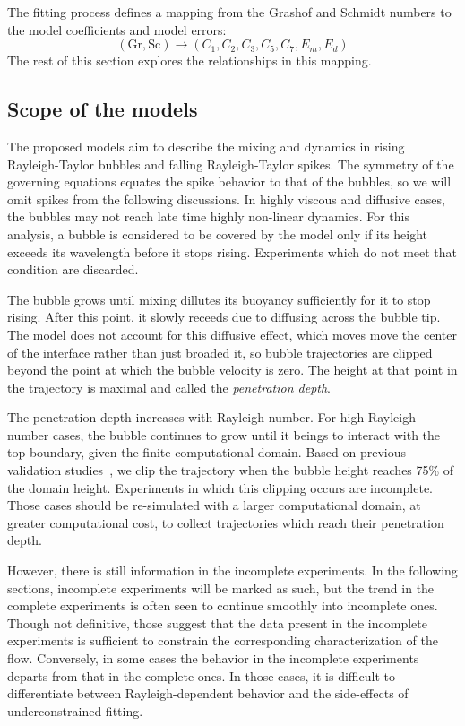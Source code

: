 The fitting process defines a mapping from the Grashof and Schmidt numbers to the model coefficients and model errors:
\begin{equation}
\left(\text{Gr}, \text{Sc}\right) \rightarrow \left(C_1, C_2, C_3, C_5, C_7, E_m, E_d\right) 
\end{equation}
The rest of this section explores the relationships in this mapping.

\subsection{Scope of the models}

The proposed models aim to describe the mixing and dynamics in rising Rayleigh-Taylor bubbles and falling Rayleigh-Taylor spikes.
The symmetry of the governing equations equates the spike behavior to that of the bubbles, so we will omit spikes from the following discussions.
In highly viscous and diffusive cases, the bubbles may not reach late time highly non-linear dynamics.
For this analysis, a bubble is considered to be covered by the model only if its height exceeds its wavelength before it stops rising.
Experiments which do not meet that condition are discarded.

The bubble grows until mixing dillutes its buoyancy sufficiently for it to stop rising.
After this point, it slowly receeds due to diffusing across the bubble tip.
The model does not account for this diffusive effect, which moves move the center of the interface rather than just broaded it, so bubble trajectories are clipped beyond the point at which the bubble velocity is zero.
The height at that point in the trajectory is maximal and called the \textit{penetration depth}.

The penetration depth increases with Rayleigh number.
For high Rayleigh number cases, the bubble continues to grow until it beings to interact with the top boundary, given the finite computational domain.
Based on previous validation studies~\cite{Hutchinson2016}, we clip the trajectory when the bubble height reaches 75\% of the domain height.
Experiments in which this clipping occurs are incomplete.
Those cases should be re-simulated with a larger computational domain, at greater computational cost, to collect trajectories which reach their penetration depth.

However, there is still information in the incomplete experiments.
In the following sections, incomplete experiments will be marked as such, but the trend in the complete experiments is often seen to continue smoothly into incomplete ones.
Though not definitive, those suggest that the data present in the incomplete experiments is sufficient to constrain the corresponding characterization of the flow.
Conversely, in some cases the behavior in the incomplete experiments departs from that in the complete ones. 
In those cases, it is difficult to differentiate between Rayleigh-dependent behavior and the side-effects of underconstrained fitting.

